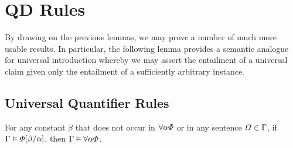 \section{QD Rules}%
  \label{sec:QDRules}

By drawing on the previous lemmas, we may prove a number of much more usable results.
In particular, the following lemma provides a semantic analogue for universal introduction whereby we may assert the entailment of a universal claim given only the entailment of a sufficiently arbitrary instance.

\subsection{Universal Quantifier Rules}%
  \label{sub:UniversalRules}
  

\begin{Lthm} \label{lemma:unigen}
  For any constant $\beta$ that does not occur in $\forall \alpha\varPhi$ or in any sentence $\varOmega\in\Gamma$, if $\Gamma \vDash \varPhi[\beta/\alpha]$, then $\Gamma \vDash \forall \alpha\varPhi$. 
\end{Lthm}

